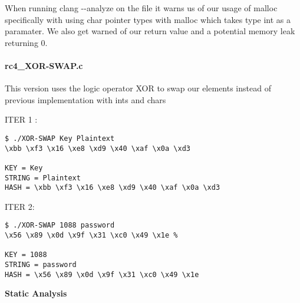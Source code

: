 When running clang -\/-analyze on the file it warns us of our usage of
malloc specifically with using char pointer types with malloc which
takes type int as a paramater. We also get warned of our return value
and a potential memory leak returning 0.

\hypertarget{rc4_xor-swapc}{%
\paragraph{rc4\_XOR-SWAP.c}\label{rc4_xor-swapc}}

This version uses the logic operator XOR to swap our elements instead of
previous implementation with ints and chars

ITER 1 :

\begin{verbatim}
$ ./XOR-SWAP Key Plaintext
\xbb \xf3 \x16 \xe8 \xd9 \x40 \xaf \x0a \xd3

KEY = Key
STRING = Plaintext
HASH = \xbb \xf3 \x16 \xe8 \xd9 \x40 \xaf \x0a \xd3
\end{verbatim}

ITER 2:

\begin{verbatim}
$ ./XOR-SWAP 1088 password
\x56 \x89 \x0d \x9f \x31 \xc0 \x49 \x1e %

KEY = 1088
STRING = password
HASH = \x56 \x89 \x0d \x9f \x31 \xc0 \x49 \x1e
\end{verbatim}

\textbf{Static Analysis}

\begin{Shaded}
\begin{Highlighting}[]
\NormalTok{:}
 
\NormalTok{\textquotesingle{}}
\NormalTok{    (} \NormalTok{(}\NormalTok{) * strlen(argv[}\NormalTok{]));}
\NormalTok{                     \^{}\textasciitilde{}\textasciitilde{}\textasciitilde{}\textasciitilde{}\textasciitilde{} \textasciitilde{}\textasciitilde{}\textasciitilde{}\textasciitilde{}\textasciitilde{}\textasciitilde{}\textasciitilde{}\textasciitilde{}\textasciitilde{}\textasciitilde{}\textasciitilde{}}
\end{Highlighting}
\end{Shaded}


